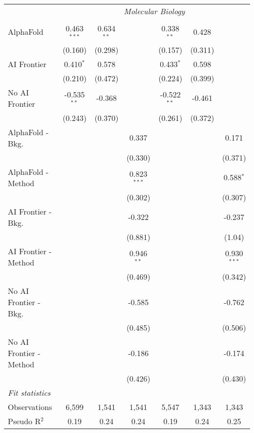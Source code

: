\begin{tabular}{lcccccc}
 & \multicolumn{6}{c}{\textit{Molecular Biology}} \\ \\
   AlphaFold               & 0.463$^{***}$ & 0.634$^{**}$ &               & 0.338$^{**}$  & 0.428   &   \\   
                           & (0.160)       & (0.298)      &               & (0.157)       & (0.311) &   \\   
   AI Frontier             & 0.410$^{*}$   & 0.578        &               & 0.433$^{*}$   & 0.598   &   \\   
                           & (0.210)       & (0.472)      &               & (0.224)       & (0.399) &   \\   
   No AI Frontier          & -0.535$^{**}$ & -0.368       &               & -0.522$^{**}$ & -0.461  &   \\   
                           & (0.243)       & (0.370)      &               & (0.261)       & (0.372) &   \\   
   AlphaFold - Bkg.        &               &              & 0.337         &               &         & 0.171\\   
                           &               &              & (0.330)       &               &         & (0.371)\\   
   AlphaFold - Method      &               &              & 0.823$^{***}$ &               &         & 0.588$^{*}$\\   
                           &               &              & (0.302)       &               &         & (0.307)\\   
   AI Frontier - Bkg.      &               &              & -0.322        &               &         & -0.237\\   
                           &               &              & (0.881)       &               &         & (1.04)\\   
   AI Frontier - Method    &               &              & 0.946$^{**}$  &               &         & 0.930$^{***}$\\   
                           &               &              & (0.469)       &               &         & (0.342)\\   
   No AI Frontier - Bkg.   &               &              & -0.585        &               &         & -0.762\\   
                           &               &              & (0.485)       &               &         & (0.506)\\   
   No AI Frontier - Method &               &              & -0.186        &               &         & -0.174\\   
                           &               &              & (0.426)       &               &         & (0.430)\\   
   \midrule
   \emph{Fit statistics}\\
   Observations            & 6,599         & 1,541        & 1,541         & 5,547         & 1,343   & 1,343\\  
   Pseudo R$^2$            & 0.19          & 0.24         & 0.24          & 0.19          & 0.24    & 0.25\\  
   

\end{tabular}
